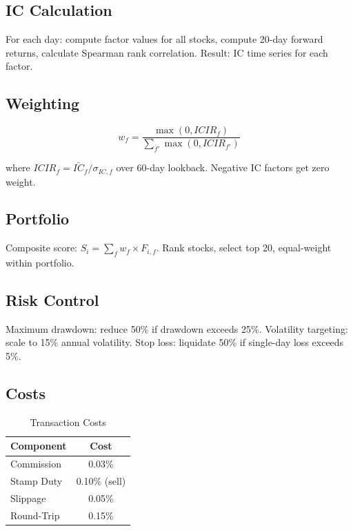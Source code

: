 \subsection{IC Calculation}

For each day: compute factor values for all stocks, compute 20-day forward returns, calculate Spearman rank correlation. Result: IC time series for each factor.

\subsection{Weighting}

\begin{equation}
w_f = \frac{\max(0, ICIR_f)}{\sum_{f'} \max(0, ICIR_{f'})}
\end{equation}

where $ICIR_f = \bar{IC}_f / \sigma_{IC,f}$ over 60-day lookback. Negative IC factors get zero weight.

\subsection{Portfolio}

Composite score: $S_i = \sum_f w_f \times F_{i,f}$. Rank stocks, select top 20, equal-weight within portfolio.

\subsection{Risk Control}

Maximum drawdown: reduce 50\% if drawdown exceeds 25\%. Volatility targeting: scale to 15\% annual volatility. Stop loss: liquidate 50\% if single-day loss exceeds 5\%.

\subsection{Costs}

\begin{table}[h]
\centering
\caption{Transaction Costs}
\begin{tabular}{lc}
\toprule
Component & Cost \\
\midrule
Commission & 0.03\% \\
Stamp Duty & 0.10\% (sell) \\
Slippage & 0.05\% \\
\midrule
Round-Trip & 0.15\% \\
\bottomrule
\end{tabular}
\end{table}

